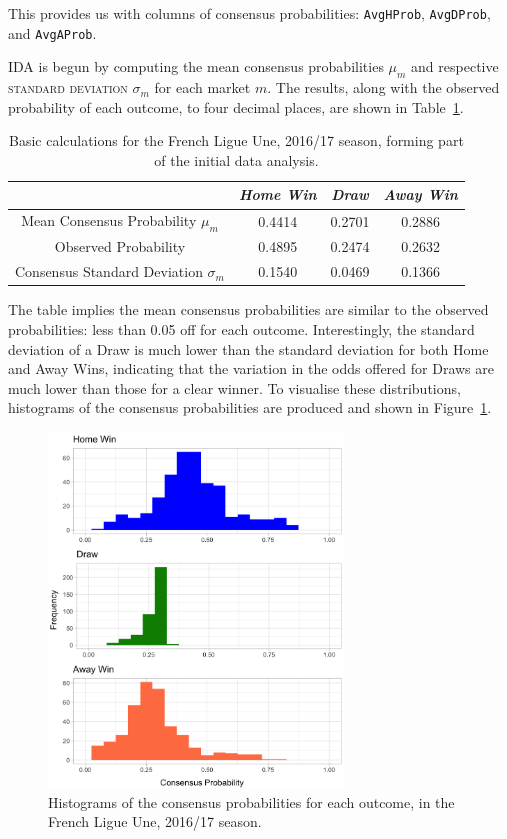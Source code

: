 \documentclass[a4paper,10pt]{report}
\begin{document}
This provides us with columns of consensus probabilities: \lstinline|AvgHProb|, \lstinline|AvgDProb|, and \lstinline|AvgAProb|.

IDA is begun by computing the mean consensus probabilities $\mu_m$ and respective \textsc{standard deviation} $\sigma_m$ for each market $m$. The results, along with the observed probability of each outcome, to four decimal places, are shown in Table~\ref{tab:idacalcs}.

\begin{table}[h!]\begin{center}\begin{tabular}[h!]{c||c|c|c}
	& \textit{Home Win} & \textit{Draw} & \textit{Away Win} \\\hline\hline
	Mean Consensus Probability $\mu_m$ & 0.4414 & 0.2701 & 0.2886 \\
	Observed Probability &0.4895&0.2474&0.2632\\\hline
	Consensus Standard Deviation $\sigma_m$&0.1540&0.0469&0.1366
\end{tabular}\end{center}\caption{Basic calculations for the French Ligue Une, 2016/17 season, forming part of the initial data analysis.}\label{tab:idacalcs}\end{table}

The table implies the mean consensus probabilities are similar to the observed probabilities: less than 0.05 off for each outcome. Interestingly, the standard deviation of a Draw is much lower than the standard deviation for both Home and Away Wins, indicating that the variation in the odds offered for Draws are much lower than those for a clear winner. To visualise these distributions, histograms of the consensus probabilities are produced and shown in Figure~\ref{FIG:01_01_idahist}.

\begin{figure}[h!]\begin{center}
	\includegraphics[width=0.7\textwidth]{elite_01_idahist.png}
	\caption{Histograms of the consensus probabilities for each outcome, in the French Ligue Une, 2016/17 season.}\label{FIG:01_01_idahist}
\end{center}\end{figure}
\end{document}
